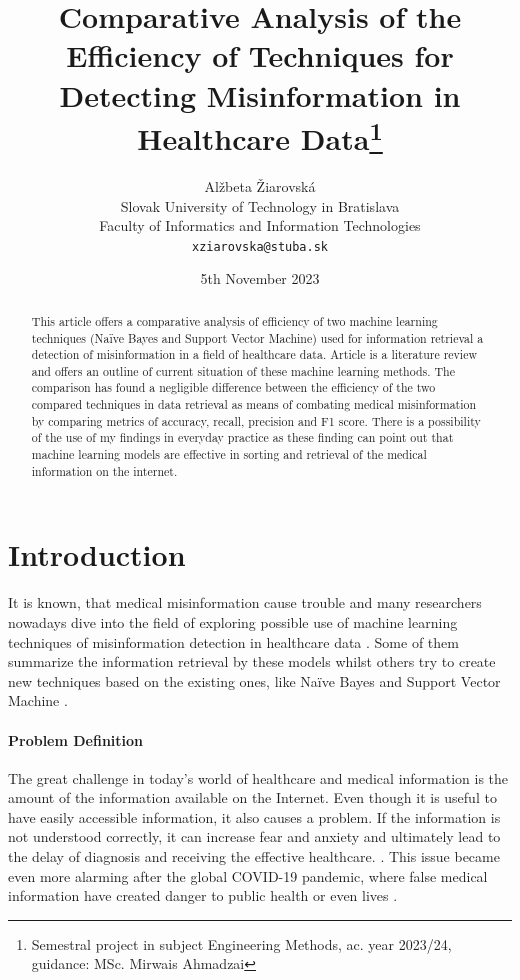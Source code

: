 \documentclass[11pt ,english,a4paper]{article}
\title{Comparative Analysis of the Efficiency of Techniques for Detecting Misinformation in Healthcare Data\thanks{Semestral project in subject Engineering Methods, ac. year 2023/24, guidance: MSc. Mirwais Ahmadzai}}
\author{Alžbeta Žiarovská\\[2pt]
	{\small Slovak University of Technology in Bratislava}\\
	{\small Faculty of Informatics and Information Technologies}\\
	{\small \texttt{xziarovska@stuba.sk}}
	}
\date{\small 5th November 2023}
\begin{document}
\maketitle
\newpage

\begin{abstract}
This article offers a comparative analysis of efficiency of two machine learning techniques (Naïve Bayes and Support Vector Machine) used for information retrieval a detection of misinformation in a field of healthcare data. Article is a literature review and offers an outline of current situation of these machine learning methods. The comparison has found a negligible difference between the efficiency of the two compared techniques in data retrieval as means of combating medical misinformation by comparing metrics of accuracy, recall, precision and F1 score. There is a possibility of the use of my findings in everyday practice as these finding can point out that machine learning models are effective in sorting and retrieval of the medical information on the internet. 
\end{abstract}
\newpage

\section{Introduction}\label{intro}

It is known, that medical misinformation cause trouble \cite{wa19sys} and many researchers nowadays dive into the field of exploring possible use of machine learning techniques of misinformation detection in healthcare data \cite{bar21health}. Some of them summarize the information retrieval by these models whilst others try to create new techniques based on the existing ones, like Naïve Bayes and Support Vector Machine \cite{chap22unmask}.

\paragraph {Problem Definition} The great challenge in today's world of healthcare and medical information is the amount of the information available on the Internet. Even though it is useful to have easily accessible information, it also causes a problem. If the information is not understood correctly, it can increase fear and anxiety and ultimately lead to the delay of diagnosis and receiving the effective healthcare. \cite{wa19sys}. This issue became even more alarming after the global COVID-19 pandemic, where false medical information have created danger to public health or even lives \cite{war18dr}. 
\end{document}
